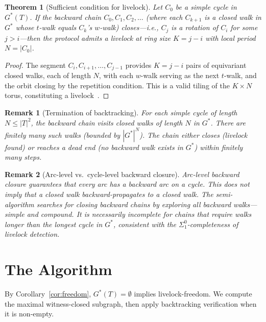 \documentclass[11pt]{article}
\newtheorem{theorem}{Theorem}
\newtheorem{remark}{Remark}
\begin{document}
\begin{theorem}[Sufficient condition for livelock]
\label{thm:sufficient}
Let $C_0$ be a simple cycle in $G^*(T)$. If the backward chain $C_0, C_1, C_2, \ldots$ (where each $C_{k+1}$ is a closed walk in $G^*$ whose $t$-walk equals $C_k$'s $w$-walk) closes---i.e., $C_j$ is a rotation of $C_i$ for some $j > i$---then the protocol admits a livelock at ring size $K = j - i$ with local period $N = |C_0|$.
\end{theorem}

\begin{proof}
The segment $C_i, C_{i+1}, \ldots, C_{j-1}$ provides $K = j-i$ pairs of equivariant closed walks, each of length $N$, with each $w$-walk serving as the next $t$-walk, and the orbit closing by the repetition condition. This is a valid tiling of the $K \times N$ torus, constituting a livelock~\cite{klinkhamer-ebnenasir}.
\end{proof}

\begin{remark}[Termination of backtracking]
For each simple cycle of length $N \leq |T|^2$, the backward chain visits closed walks of length $N$ in $G^*$. There are finitely many such walks (bounded by $|G^*|^N$). The chain either closes (livelock found) or reaches a dead end (no backward walk exists in $G^*$) within finitely many steps.
\end{remark}

\begin{remark}[Arc-level vs.\ cycle-level backward closure]
\label{rem:gap}
Arc-level backward closure guarantees that every arc has a backward arc on a cycle. This does not imply that a closed walk backward-propagates to a closed walk. The semi-algorithm searches for closing backward chains by exploring all backward walks---simple and compound. It is necessarily incomplete for chains that require walks longer than the longest cycle in $G^*$, consistent with the $\Sigma^0_1$-completeness of livelock detection.
\end{remark}

\section{The Algorithm}
\label{sec:algorithm}

By Corollary~\ref{cor:freedom}, $G^*(T) = \emptyset$ implies livelock-freedom. We compute the maximal witness-closed subgraph, then apply backtracking verification when it is non-empty.
\end{document}
